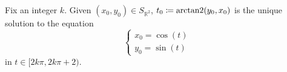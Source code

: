 \begin{proposition}\label{thm:arctantwo}
  Fix an integer \( k \). Given \( (x_0, y_0) \in S_{\BbbR^2} \), \( t_0 \coloneqq \operatorname{arctan2}(y_0, x_0) \) is the unique solution to the equation
  \begin{equation}\label{thm:arctantwo/equation}
    \begin{cases}
      x_0 = \cos(t) \\
      y_0 = \sin(t)
    \end{cases}
  \end{equation}
  in \( t \in [2k\pi, 2k\pi + 2) \).
\end{proposition}
